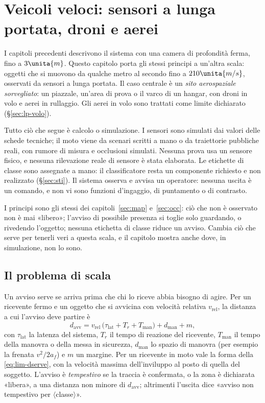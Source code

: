 \section{Veicoli veloci: sensori a lunga portata, droni e aerei}\label{sec:lp}

I capitoli precedenti descrivono il sistema con una camera di profondità ferma, fino a $3\unita{m}$. Questo capitolo porta gli stessi principi a un'altra scala: oggetti che si muovono da qualche metro al secondo fino a $210\unita{m/s}$, osservati da sensori a lunga portata. Il caso centrale è un \emph{sito aerospaziale sorvegliato}: un piazzale, un'area di prova o il varco di un hangar, con droni in volo e aerei in rullaggio. Gli aerei in volo sono trattati come limite dichiarato (\S\ref{sec:lp-volo}).

Tutto ciò che segue è calcolo o simulazione. I sensori sono simulati dai valori delle schede tecniche; il moto viene da scenari scritti a mano o da traiettorie pubbliche reali, con rumore di misura e occlusioni simulati. Nessuna prova usa un sensore fisico, e nessuna rilevazione reale di sensore è stata elaborata. Le etichette di classe sono assegnate a mano: il classificatore resta un componente richiesto e non realizzato (\S\ref{sec:sti}). Il sistema osserva e avvisa un operatore: nessuna uscita è un comando, e non vi sono funzioni d'ingaggio, di puntamento o di contrasto.

I principi sono gli stessi dei capitoli~\ref{sec:map} e~\ref{sec:occ}: ciò che non è osservato non è mai «libero»; l'avviso di possibile presenza si toglie solo guardando, o rivedendo l'oggetto; nessuna etichetta di classe riduce un avviso. Cambia ciò che serve per tenerli veri a questa scala, e il capitolo mostra anche dove, in simulazione, non lo sono.

\subsection{Il problema di scala}\label{sec:lp-scala}

Un avviso serve se arriva prima che chi lo riceve abbia bisogno di agire. Per un ricevente fermo e un oggetto che si avvicina con velocità relativa $v_{\mathrm{rel}}$, la distanza a cui l'avviso deve partire è
\begin{equation}\label{eq:lp-davv}
d_{\mathrm{avv}} = v_{\mathrm{rel}}\,\bigl(\tau_{\mathrm{lat}}+T_r+T_{\mathrm{man}}\bigr)+d_{\mathrm{man}}+m ,
\end{equation}
con $\tau_{\mathrm{lat}}$ la latenza del sistema, $T_r$ il tempo di reazione del ricevente, $T_{\mathrm{man}}$ il tempo della manovra o della messa in sicurezza, $d_{\mathrm{man}}$ lo spazio di manovra (per esempio la frenata $v^2/2a_f$) e $m$ un margine. Per un ricevente in moto vale la forma della \eqref{eq:lim-dserve}, con la velocità massima dell'inviluppo al posto di quella del soggetto. L'avviso è \emph{tempestivo} se la traccia è confermata, o la zona è dichiarata «libera», a una distanza non minore di $d_{\mathrm{avv}}$; altrimenti l'uscita dice «avviso non tempestivo per $\langle$classe$\rangle$».

